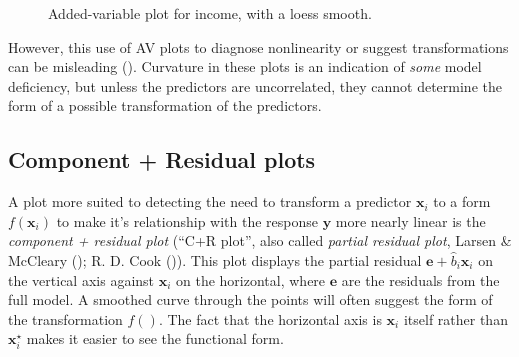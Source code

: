 \documentclass[
  letterpaper,
  10pt,
  krantz2]{krantz}
\begin{document}
{\begin{figure}[H]


\caption{\label{fig-prestige-av-income}Added-variable plot for income,
with a loess smooth.}

\end{figure}%

However, this use of AV plots to diagnose nonlinearity or suggest
transformations can be misleading (). Curvature in these plots is an indication of \emph{some} model
deficiency, but unless the predictors are uncorrelated, they cannot
determine the form of a possible transformation of the predictors.

\subsection{Component + Residual plots}\label{component-residual-plots}

A plot more suited to detecting the need to transform a predictor
\(\mathbf{x}_i\) to a form \(f(\mathbf{x}_i)\) to make it's relationship
with the response \(\mathbf{y}\) more nearly linear is the
\emph{component + residual plot} (``C+R plot'', also called
\emph{partial residual plot}, Larsen \& McCleary
(); R. D. Cook
()). This plot displays the partial residual
\(\mathbf{e} + \hat{b}_i \mathbf{x}_i\) on the vertical axis against
\(\mathbf{x}_i\) on the horizontal, where \(\mathbf{e}\) are the
residuals from the full model. A smoothed curve through the points will
often suggest the form of the transformation \(f()\). The fact that the
horizontal axis is \(\mathbf{x}_i\) itself rather than
\(\mathbf{x}^\star_i\) makes it easier to see the functional form.

}
\end{document}
